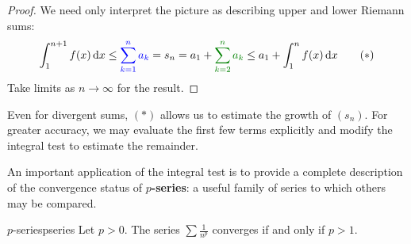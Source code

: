 \begin{proof}
	We need only interpret the picture as describing upper and lower Riemann sums:
	\[
		\int_1^{n+1}f(x)\,\dx\le\textcolor{blue}{\sum_{k=1}^n a_k} =s_n= a_1+\textcolor{Green}{\sum_{k=2}^na_k}\le a_1+\int_1^nf(x)\,\dx \tag*{($\ast$)}
	\]
	Take limits as $n\to\infty$ for the result.
\end{proof}


Even for divergent sums, $(\ast)$ allows us to estimate the growth of $(s_n)$. For greater accuracy, we may evaluate the first few terms explicitly and modify the integral test to estimate the remainder.\smallbreak

An important application of the integral test is to provide a complete description of the convergence status of \textbf{$p$-series}: a useful family of series to which others may be compared.

\begin{cor}{$p$-series}{pseries}
 	Let $p>0$. The series $\sum\frac 1{n^p}$ converges if and only if $p>1$.
\end{cor}

\goodbreak


